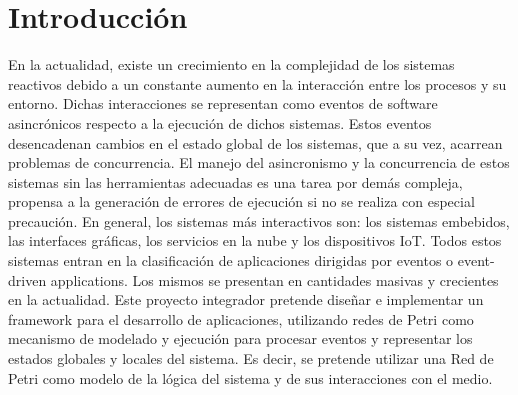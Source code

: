 \section{Introducción}
En la actualidad, existe un crecimiento en la complejidad de los sistemas
reactivos debido a un constante aumento en la interacción entre los procesos y
su entorno. Dichas interacciones se representan como eventos de software
asincrónicos respecto a la ejecución de dichos sistemas. Estos eventos
desencadenan cambios en el estado global de los sistemas, que a su vez,
acarrean problemas de concurrencia.
El manejo del asincronismo y la concurrencia de estos sistemas sin las
herramientas adecuadas es una tarea por demás compleja, propensa a la
generación de errores de ejecución si no se realiza con especial precaución.
En general, los sistemas más interactivos son: los sistemas embebidos, las
interfaces gráficas, los servicios en la nube y los dispositivos IoT. Todos
estos sistemas entran en la clasificación de aplicaciones dirigidas por eventos
o event-driven applications.\cite{chimp} Los mismos se presentan en
cantidades masivas y crecientes en la actualidad.
Este proyecto integrador pretende diseñar e implementar un framework para el
desarrollo de aplicaciones, utilizando redes de Petri como mecanismo de
modelado y ejecución para procesar eventos y representar los estados globales y
locales del sistema. Es decir, se pretende utilizar una Red de Petri como
modelo de la lógica del sistema y de sus interacciones con el medio.

